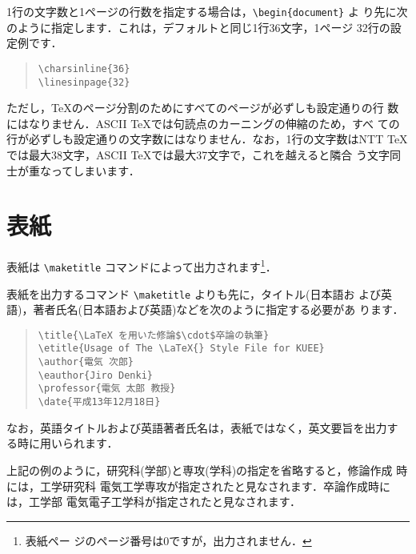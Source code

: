 \documentclass[
  sotsuron]{kuee}
\begin{document}
1行の文字数と1ページの行数を指定する場合は，\verb+\begin{document}+ よ
り先に次のように指定します．これは，デフォルトと同じ1行36文字，1ページ
32行の設定例です．

\begin{quote}
  \begin{verbatim}
\charsinline{36}
\linesinpage{32}
\end{verbatim}
\end{quote}

ただし，\TeX のページ分割のためにすべてのページが必ずしも設定通りの行
数にはなりません．ASCII \TeX では句読点のカーニングの伸縮のため，すべ
ての行が必ずしも設定通りの文字数にはなりません．なお，1行の文字数はNTT
\TeX では最大38文字，ASCII \TeX では最大37文字で，これを越えると隣合
う文字同士が重なってしまいます．

\hypertarget{ux8868ux7d19}{%
\section{表紙}\label{ux8868ux7d19}}

表紙は \verb+\maketitle+ コマンドによって出力されます\footnote{表紙ペー
  ジのページ番号は0ですが，出力されません．}．

表紙を出力するコマンド \verb+\maketitle+ よりも先に，タイトル(日本語お
よび英語)，著者氏名(日本語および英語)などを次のように指定する必要があ
ります．

\begin{quote}
  \begin{verbatim}
\title{\LaTeX を用いた修論$\cdot$卒論の執筆}
\etitle{Usage of The \LaTeX{} Style File for KUEE}
\author{電気 次郎}
\eauthor{Jiro Denki}
\professor{電気 太郎 教授}
\date{平成13年12月18日}
\end{verbatim}
\end{quote}

なお，英語タイトルおよび英語著者氏名は，表紙ではなく，英文要旨を出力す
る時に用いられます．

上記の例のように，研究科(学部)と専攻(学科)の指定を省略すると，修論作成
時には，工学研究科 電気工学専攻が指定されたと見なされます．卒論作成時に
は，工学部 電気電子工学科が指定されたと見なされます．
\end{document}
